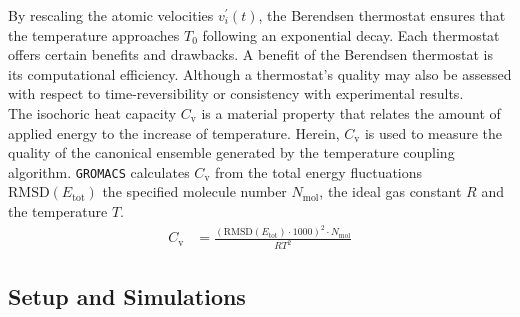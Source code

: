 \documentclass[9pt,tutorial]{livecoms}
\begin{document}
By rescaling the atomic velocities $v_i^\prime (t)$, the Berendsen thermostat ensures that the temperature approaches $T_0$ following an exponential decay. Each thermostat offers certain benefits and drawbacks. A benefit of the Berendsen thermostat is its computational efficiency. Although a thermostat's quality may also be assessed with respect to time-reversibility or consistency with experimental results.\cite{Hnenberger2005,Braun_2019}\\
The isochoric heat capacity $C_\text{v}$ is a material property that relates the amount of applied energy to the increase of temperature. Herein, $C_\text{v}$ is used to measure the quality of the canonical ensemble generated by the temperature coupling algorithm. \texttt{GROMACS} calculates $C_\text{v}$ from the total energy fluctuations $\text{RMSD}(E_\text{tot})$ the specified molecule number $N_\text{mol}$, the ideal gas constant $R$ and the temperature $T$.\cite{Allen1990}
\begin{align}
	C_\text{v} & = \frac{\left(\text{RMSD}(E_\text{tot}) \cdot 1000 \right)^2 \cdot N_\text{mol}}{RT^2}
\end{align}

\subsection*{Setup and Simulations}
\end{document}
